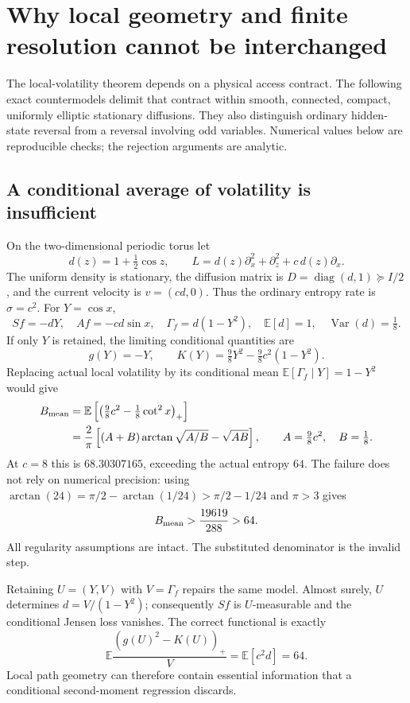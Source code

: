 \chapter{Why local geometry and finite resolution cannot be interchanged}
\label{chap:og-countermodels}

The local-volatility theorem depends on a physical access contract. The
following exact countermodels delimit that contract within smooth, connected,
compact, uniformly elliptic stationary diffusions. They also distinguish
ordinary hidden-state reversal from a reversal involving odd variables.
Numerical values below are reproducible checks; the rejection arguments are
analytic.

\section{A conditional average of volatility is insufficient}
On the two-dimensional periodic torus let
\[
 d(z)=1+\tfrac12\cos z,\qquad
 L=d(z)\partial_x^2+\partial_z^2+c\,d(z)\partial_x.
\]
The uniform density is stationary, the diffusion matrix is
$D=\operatorname{diag}(d,1)\succeq I/2$, and the current velocity is
$v=(cd,0)$. Thus the ordinary entropy rate is $\sigma=c^2$.
For $Y=\cos x$,
\[
 Sf=-dY,\quad Af=-cd\sin x,\quad
 \Gamma_f=d(1-Y^2),\quad
 \mathbb E[d]=1,\quad \operatorname{Var}(d)=\tfrac18.
\]
If only $Y$ is retained, the limiting conditional quantities are
\[
 g(Y)=-Y,\qquad
 K(Y)=\tfrac98Y^2-\tfrac98c^2(1-Y^2).
\]
Replacing actual local volatility by its conditional mean
$\mathbb E[\Gamma_f\mid Y]=1-Y^2$ would give
\begin{align*}
 B_{\rm mean}
 &=\mathbb E\left[\left(\tfrac98c^2-\tfrac18\cot^2x\right)_+\right]\\
 &=\frac2\pi\left[(A+B)\arctan\sqrt{A/B}-\sqrt{AB}\right],
 \qquad A=\tfrac98c^2,\quad B=\tfrac18.
\end{align*}
At $c=8$ this is $68.30307165$, exceeding the actual entropy $64$.
The failure does not rely on numerical precision: using
$\arctan(24)=\pi/2-\arctan(1/24)>\pi/2-1/24$ and $\pi>3$ gives
\[
 B_{\rm mean}>\frac{19619}{288}>64.
\]
All regularity assumptions are intact. The substituted denominator is the
invalid step.

Retaining $U=(Y,V)$ with $V=\Gamma_f$ repairs the same model. Almost surely,
$U$ determines $d=V/(1-Y^2)$; consequently $Sf$ is $U$-measurable and the
conditional Jensen loss vanishes. The correct functional is exactly
\[
 \mathbb E\frac{(g(U)^2-K(U))_+}{V}
 =\mathbb E[c^2d]=64.
\]
Local path geometry can therefore contain essential information that a
conditional second-moment regression discards.

